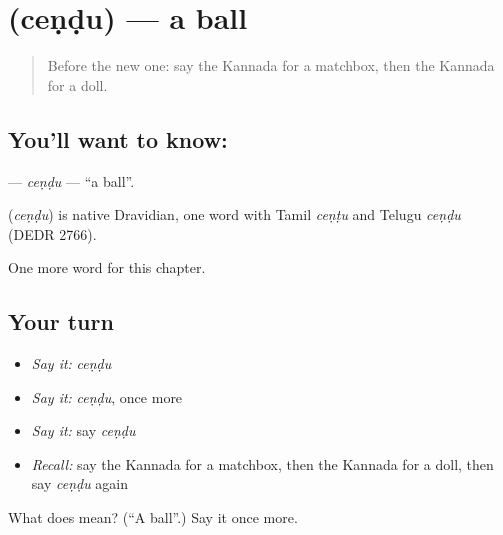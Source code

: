 \section[\texorpdfstring{\kn{ಚೆಂಡು} (ceṇḍu)}{ಚೆಂಡು (ceṇḍu)}]{ (ceṇḍu) — a ball}

\label{lesson:KA-C119-cendu}



\begin{quote}
Before the new one: say the Kannada for a matchbox, then the Kannada for a doll.
\end{quote}

\subsection*{You'll want to know: }
\textbf{} — \emph{ceṇḍu} — \textquotedblleft{}a ball\textquotedblright{}.

\begin{cousinweb}
\textbf{} (\emph{ceṇḍu}) is native Dravidian, one word with Tamil \emph{ceṇṭu} and Telugu \emph{ceṇḍu} (DEDR 2766).
\end{cousinweb}

\begin{grammarlens}[title={What you've built}]
One more word for this chapter.
\end{grammarlens}

\subsection*{Your turn}
\begin{itemize}
\raggedright
  \item \emph{Say it:} \emph{ceṇḍu}
  \item \emph{Say it:} \emph{ceṇḍu}, once more
  \item \emph{Say it:} say \emph{ceṇḍu}
  \item \emph{Recall:} say the Kannada for a matchbox, then the Kannada for a doll, then say \emph{ceṇḍu} again
\end{itemize}

\begin{tcolorbox}[breakable,colback=teal!4,colframe=teal!35!black,title={Before you move on}]
What does  mean? (\textquotedblleft{}A ball\textquotedblright{}.) Say it once more.
\end{tcolorbox}
